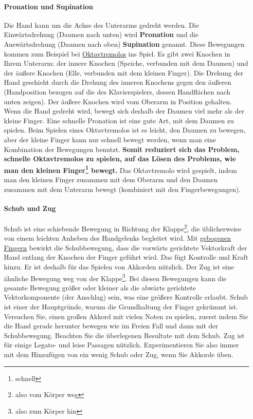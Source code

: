 \paragraph{Pronation und Supination}
\label{c1iii4ProSup}

Die Hand kann um die Achse des Unterarms gedreht werden.
Die Einwärtsdrehung (Daumen nach unten) wird \textbf{Pronation} und die Auswärtsdrehung (Daumen nach oben) \textbf{Supination} genannt.
Diese Bewegungen kommen zum  Beispiel bei \hyperref[c1iii3b]{Oktavtremolos} ins Spiel.
Es gibt zwei Knochen in Ihrem Unterarm: der innere Knochen (Speiche, verbunden mit dem Daumen) und der äußere Knochen (Elle, verbunden mit dem kleinen Finger).
Die Drehung der Hand geschieht durch die Drehung des inneren Knochens gegen den äußeren (Handposition bezogen auf die des Klavierspielers, dessen Handflächen nach unten zeigen).
Der äußere Knochen wird vom Oberarm in Position gehalten.
Wenn die Hand gedreht wird, bewegt sich deshalb der Daumen viel mehr als der kleine Finger.
Eine schnelle Pronation ist eine gute Art, mit dem Daumen zu spielen.
Beim Spielen eines Oktavtremolos ist es leicht, den Daumen zu bewegen, aber der kleine Finger kann nur schnell bewegt werden, wenn man eine Kombination der Bewegungen benutzt.
\textbf{Somit reduziert sich das Problem, schnelle Oktavtremolos zu spielen, auf das Lösen des Problems, wie man den kleinen Finger\footnote{schnell} bewegt.}
Das Oktavtremolo wird gespielt, indem man den kleinen Finger zusammen mit dem Oberarm und den Daumen zusammen mit dem Unterarm bewegt (kombiniert mit den Fingerbewegungen).
 

\paragraph{Schub und Zug}
\label{c1iii4SchubZug}

Schub ist eine schiebende Bewegung in Richtung der Klappe\footnote{also vom Körper weg}, die üblicherweise von einem leichten Anheben des Handgelenks begleitet wird.
Mit \hyperref[c1ii2]{gebogenen Fingern} bewirkt die Schubbewegung, dass die vorwärts gerichtete Vektorkraft der Hand entlang der Knochen der Finger geführt wird.
Das fügt Kontrolle und Kraft hinzu.
Er ist deshalb für das Spielen von Akkorden nützlich.
Der Zug ist eine ähnliche Bewegung weg von der Klappe\footnote{also zum Körper hin}.
Bei diesen Bewegungen kann die gesamte Bewegung größer oder kleiner als die abwärts gerichtete Vektorkomponente (der Anschlag) sein, was eine größere Kontrolle erlaubt.
Schub ist einer der Hauptgründe, warum die Grundhaltung der Finger gekrümmt ist.
Versuchen Sie, einen großen Akkord mit vielen Noten zu spielen, zuerst indem Sie die Hand gerade herunter bewegen wie im Freien Fall und dann mit der Schubbewegung.
Beachten Sie die überlegenen Resultate mit dem Schub.
Zug ist für einige Legato- und leise Passagen nützlich.
Experimentieren Sie also immer mit dem Hinzufügen von ein wenig Schub oder Zug, wenn Sie Akkorde üben.


